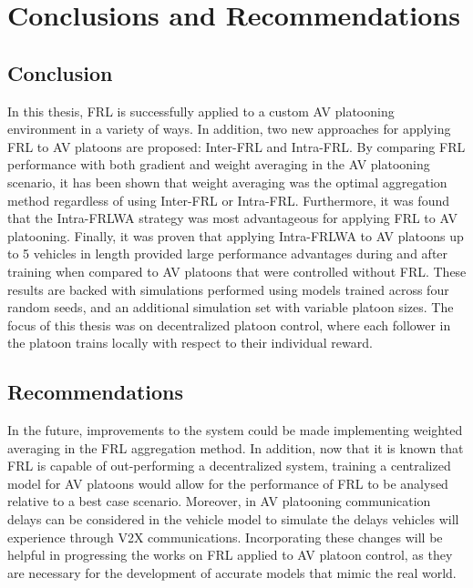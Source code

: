 \chapter{Conclusions and Recommendations} \label{chap:conclusion}
\section{Conclusion}
In this thesis, FRL is successfully applied to a custom AV platooning environment in a variety of ways.
In addition, two new approaches for applying
FRL to AV platoons are proposed: Inter-FRL and Intra-FRL.  By comparing FRL performance with both
gradient and weight averaging in the AV platooning scenario, it has been shown that
weight averaging was the optimal aggregation method regardless of using Inter-FRL or
Intra-FRL.  Furthermore, it was found that the Intra-FRLWA strategy was most advantageous
for applying FRL to AV platooning.  Finally, it was proven that applying Intra-FRLWA to
AV platoons up to 5 vehicles in length provided large performance advantages during and
after training when compared to AV platoons that were controlled without FRL. These
results are backed with simulations performed using models trained across four random
seeds, and an additional simulation set with variable platoon sizes.  The focus of this
thesis was on decentralized platoon control, where each follower in the platoon trains
locally with respect to their individual reward.

\section{Recommendations}
In the future, improvements to the system could be made implementing weighted averaging in
the FRL aggregation method. In addition, now that it is known that FRL is capable of out-performing
a decentralized system, training a centralized model for AV platoons
would allow for the performance of FRL to be analysed relative to a best case scenario.
Moreover, in AV platooning communication delays can be
considered in the vehicle model to simulate the delays vehicles will experience through V2X
communications. Incorporating these changes will be helpful in progressing the works on FRL applied to AV
platoon control, as they are necessary for the development of accurate models that mimic the real world.
